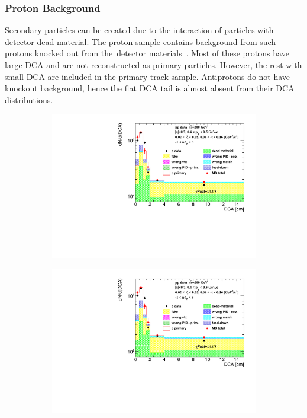 \subsubsection{Proton Background}\label{section:star_background_proton}
Secondary particles can be created due to the interaction of particles with detector dead-material.
The proton sample contains background from such protons knocked out  from the~detector materials~\cite{STAR:spectra}. Most of these protons have large $\textrm{DCA}$ and are not reconstructed as primary particles. However, the rest with small $\textrm{DCA}$  are included in the primary track sample. Antiprotons do not have knockout background, hence the flat $\textrm{DCA}$ tail is almost absent from their $\textrm{DCA}$ distributions.

\begin{figure}[b!]
	\centering
	\begin{subfigure}{.47\textwidth}
		\includegraphics[width=\linewidth, page=1]{chapters/chrgSTAR/img/DCAproton/background_p_0.pdf}
	\end{subfigure}
	\begin{subfigure}{.47\textwidth}
		\includegraphics[width=\linewidth, page=2]{chapters/chrgSTAR/img/DCAproton/background_p_0.pdf}

\end{subfigure}
\end{figure}
